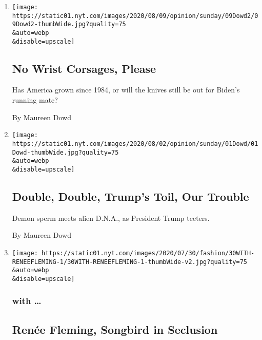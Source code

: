\begin{enumerate}
\def\labelenumi{\arabic{enumi}.}
\item
  \href{/2020/08/08/opinion/sunday/biden-vice-president-geraldine-ferraro.html}{}

  \texttt{[image: https://static01.nyt.com/images/2020/08/09/opinion/sunday/09Dowd2/09Dowd2-thumbWide.jpg?quality=75\\\&auto=webp\\\&disable=upscale]}

  \hypertarget{no-wrist-corsages-please}{%
  \subsection{No Wrist Corsages,
  Please}\label{no-wrist-corsages-please}}

  Has America grown since 1984, or will the knives still be out for
  Biden's running mate?

  By Maureen Dowd
\item
  \href{/2020/08/01/opinion/sunday/trump-coronavirus-herman-cain.html}{}

  \texttt{[image: https://static01.nyt.com/images/2020/08/02/opinion/sunday/01Dowd/01Dowd-thumbWide.jpg?quality=75\\\&auto=webp\\\&disable=upscale]}

  \hypertarget{double-double-trumps-toil-our-trouble}{%
  \subsection{Double, Double, Trump's Toil, Our
  Trouble}\label{double-double-trumps-toil-our-trouble}}

  Demon sperm meets alien D.N.A., as President Trump teeters.

  By Maureen Dowd
\item
  \href{/2020/07/30/style/maureen-dowd-renee-fleming.html}{}

  \texttt{[image: https://static01.nyt.com/images/2020/07/30/fashion/30WITH-RENEEFLEMING-1/30WITH-RENEEFLEMING-1-thumbWide-v2.jpg?quality=75\\\&auto=webp\\\&disable=upscale]}

  \hypertarget{with-}{%
  \subsubsection{with \ldots{}}\label{with-}}

  \hypertarget{renuxe9e-fleming-songbird-in-seclusion}{%
  \subsection{Renée Fleming, Songbird in
  Seclusion}\label{renuxe9e-fleming-songbird-in-seclusion}}


\end{enumerate}
